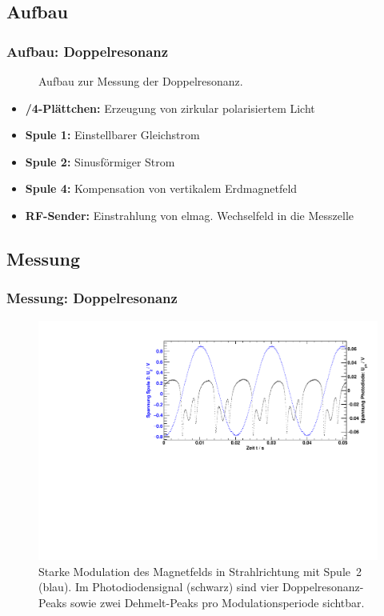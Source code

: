 \subsection{Aufbau}
\begin{frame}
\frametitle{Aufbau: Doppelresonanz}

\begin{figure}
    \centering
    \def\svgwidth{\textwidth}
    
    \caption{Aufbau zur Messung der Doppelresonanz.}
\end{figure}

\begin{itemize}
  \item \textbf{\textlambda/4-Plättchen:} Erzeugung von zirkular polarisiertem Licht
  \item \textbf{Spule 1:} Einstellbarer Gleichstrom
  \item \textbf{Spule 2:} Sinusförmiger Strom
  \item \textbf{Spule 4:} Kompensation von vertikalem Erdmagnetfeld
  \item \textbf{RF-Sender:} Einstrahlung von elmag. Wechselfeld in die Messzelle
\end{itemize}

\end{frame}

\subsection{Messung}

\begin{frame}
\frametitle{Messung: Doppelresonanz}
\begin{figure}
    \begin{center}
        \includegraphics[width=\textwidth]{../img/06.pdf}
        \caption{Starke Modulation des Magnetfelds in Strahlrichtung mit Spule~2 (blau).
        Im Photodiodensignal (schwarz) sind vier Doppelresonanz-Peaks sowie
        zwei Dehmelt-Peaks pro Modulationsperiode sichtbar.}
        \label{img:dehmeltrf}
    \end{center}
\end{figure}
\end{frame}


